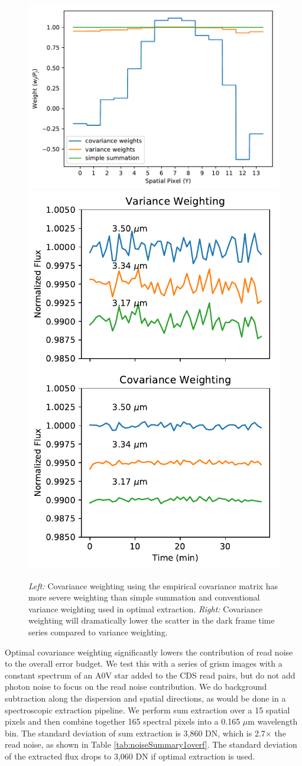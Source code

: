 \documentclass[]{aastex62}
\begin{document}
\begin{figure}[!hbtp]
\centering
\includegraphics[width=.66\columnwidth]{cov_weighted_weights.pdf}
\includegraphics[width=.32\columnwidth]{zoom_cov_vs_var_tser.pdf}
\caption{ {\it Left:} Covariance weighting using the empirical covariance matrix has more severe weighting than simple summation and conventional variance weighting used in optimal extraction. {\it Right:} Covariance weighting will dramatically lower the scatter in the dark frame time series compared to variance weighting.}\label{fig:covWeightedSummation}
\end{figure}

Optimal covariance weighting significantly lowers the contribution of read noise to the overall error budget.
We test this with a series of grism images with a constant spectrum of an A0V star added to the CDS read pairs, but do not add photon noise to focus on the read noise contribution.
We do background subtraction along the dispersion and spatial directions, as would be done in a spectroscopic extraction pipeline.
We perform sum extraction over a 15 spatial pixels and then combine together 165 spectral pixels into a 0.165 $\mu$m wavelength bin.
The standard deviation of sum extraction is 3,860 DN, which is 2.7$\times$ the read noise, as shown in Table \ref{tab:noiseSummary1overf}.
The standard deviation of the extracted flux drops to 3,060 DN if optimal extraction is used.
\end{document}
